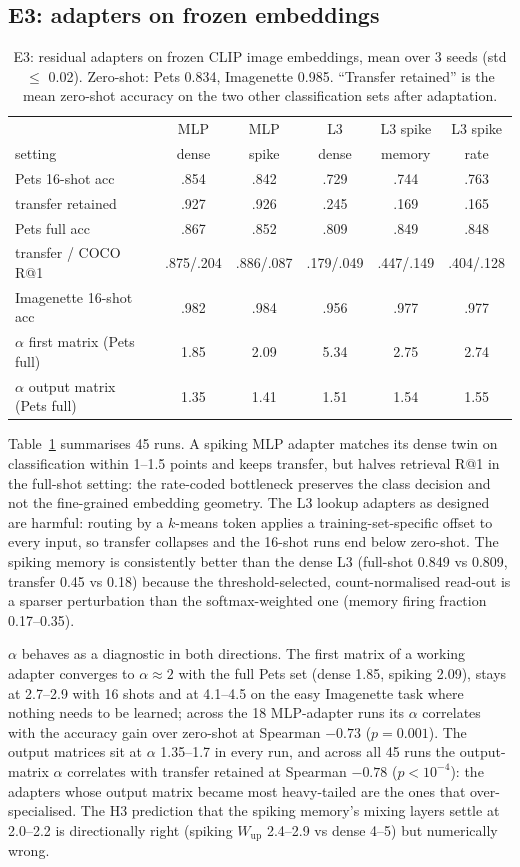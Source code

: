 \subsection{E3: adapters on frozen embeddings}
\begin{table}[t]
\centering
\small
\begin{tabular}{lccccc}
\toprule
 & MLP & MLP & L3 & L3 spike & L3 spike \\
setting & dense & spike & dense & memory & rate \\
\midrule
Pets 16-shot acc & .854 & .842 & .729 & .744 & .763 \\
\quad transfer retained & .927 & .926 & .245 & .169 & .165 \\
Pets full acc & .867 & .852 & .809 & .849 & .848 \\
\quad transfer / COCO R@1 & .875/.204 & .886/.087 & .179/.049 & .447/.149 & .404/.128 \\
Imagenette 16-shot acc & .982 & .984 & .956 & .977 & .977 \\
$\alpha$ first matrix (Pets full) & 1.85 & 2.09 & 5.34 & 2.75 & 2.74 \\
$\alpha$ output matrix (Pets full) & 1.35 & 1.41 & 1.51 & 1.54 & 1.55 \\
\bottomrule
\end{tabular}
\caption{E3: residual adapters on frozen CLIP image embeddings, mean over 3 seeds (std $\le$ 0.02). Zero-shot: Pets 0.834, Imagenette 0.985. ``Transfer retained'' is the mean zero-shot accuracy on the two other classification sets after adaptation.}
\label{tab:e3}
\end{table}
Table~\ref{tab:e3} summarises 45 runs. A spiking MLP adapter matches its dense twin on classification within 1--1.5 points and keeps transfer, but halves retrieval R@1 in the full-shot setting: the rate-coded bottleneck preserves the class decision and not the fine-grained embedding geometry. The L3 lookup adapters as designed are harmful: routing by a $k$-means token applies a training-set-specific offset to every input, so transfer collapses and the 16-shot runs end below zero-shot. The spiking memory is consistently better than the dense L3 (full-shot 0.849 vs 0.809, transfer 0.45 vs 0.18) because the threshold-selected, count-normalised read-out is a sparser perturbation than the softmax-weighted one (memory firing fraction 0.17--0.35).

$\alpha$ behaves as a diagnostic in both directions. The first matrix of a working adapter converges to $\alpha \approx 2$ with the full Pets set (dense 1.85, spiking 2.09), stays at 2.7--2.9 with 16 shots and at 4.1--4.5 on the easy Imagenette task where nothing needs to be learned; across the 18 MLP-adapter runs its $\alpha$ correlates with the accuracy gain over zero-shot at Spearman $-0.73$ ($p=0.001$). The output matrices sit at $\alpha$ 1.35--1.7 in every run, and across all 45 runs the output-matrix $\alpha$ correlates with transfer retained at Spearman $-0.78$ ($p<10^{-4}$): the adapters whose output matrix became most heavy-tailed are the ones that over-specialised. The H3 prediction that the spiking memory's mixing layers settle at 2.0--2.2 is directionally right (spiking $W_{\mathrm{up}}$ 2.4--2.9 vs dense 4--5) but numerically wrong.

